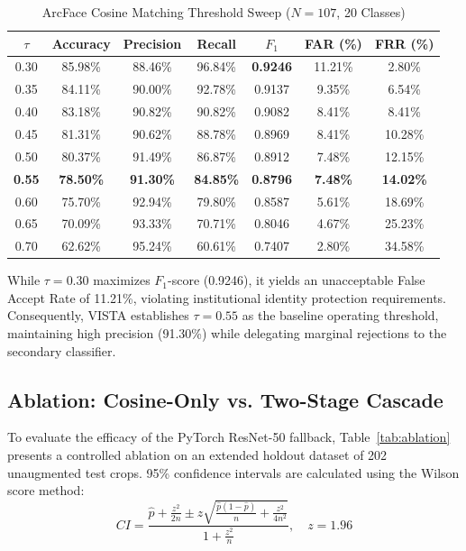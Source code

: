 \documentclass[conference]{IEEEtran}
\begin{document}
\begin{table}[t]
\caption{ArcFace Cosine Matching Threshold Sweep ($N=107$, 20 Classes)}
\label{tab:sweep}
\centering
\small
\begin{tabular}{ccccccc}
\toprule
$\tau$ & Accuracy & Precision & Recall & $F_1$ & FAR (\%) & FRR (\%) \\
\midrule
0.30 & 85.98\% & 88.46\% & 96.84\% & \textbf{0.9246} & 11.21\% & 2.80\% \\
0.35 & 84.11\% & 90.00\% & 92.78\% & 0.9137 & 9.35\% & 6.54\% \\
0.40 & 83.18\% & 90.82\% & 90.82\% & 0.9082 & 8.41\% & 8.41\% \\
0.45 & 81.31\% & 90.62\% & 88.78\% & 0.8969 & 8.41\% & 10.28\% \\
0.50 & 80.37\% & 91.49\% & 86.87\% & 0.8912 & 7.48\% & 12.15\% \\
\textbf{0.55} & \textbf{78.50\%} & \textbf{91.30\%} & \textbf{84.85\%} & \textbf{0.8796} & \textbf{7.48\%} & \textbf{14.02\%} \\
0.60 & 75.70\% & 92.94\% & 79.80\% & 0.8587 & 5.61\% & 18.69\% \\
0.65 & 70.09\% & 93.33\% & 70.71\% & 0.8046 & 4.67\% & 25.23\% \\
0.70 & 62.62\% & 95.24\% & 60.61\% & 0.7407 & 2.80\% & 34.58\% \\
\bottomrule
\end{tabular}
\end{table}

While $\tau=0.30$ maximizes $F_1$-score (0.9246), it yields an unacceptable False Accept Rate of 11.21\%, violating institutional identity protection requirements. Consequently, VISTA establishes $\tau=0.55$ as the baseline operating threshold, maintaining high precision (91.30\%) while delegating marginal rejections to the secondary classifier.

\subsection{Ablation: Cosine-Only vs. Two-Stage Cascade}
To evaluate the efficacy of the PyTorch ResNet-50 fallback, Table~\ref{tab:ablation} presents a controlled ablation on an extended holdout dataset of 202 unaugmented test crops. 95\% confidence intervals are calculated using the Wilson score method:
\begin{equation}
CI = \frac{\hat{p} + \frac{z^2}{2n} \pm z\sqrt{\frac{\hat{p}(1-\hat{p})}{n} + \frac{z^2}{4n^2}}}{1 + \frac{z^2}{n}}, \quad z=1.96
\end{equation}
\end{document}
